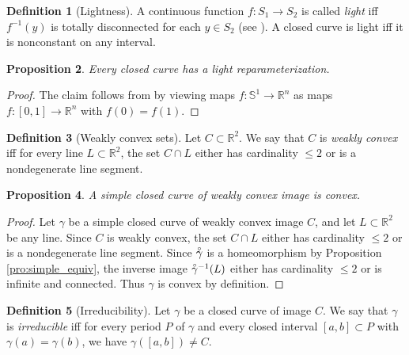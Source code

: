 \documentclass{amsart}
\newtheorem{proposition}{Proposition}[section]
\theoremstyle{definition}
\newtheorem{definition}[proposition]{Definition}
\theoremstyle{remark}
\newcommand{\lring}[1]{\accentset{\circ}{#1}}
\begin{document}
\begin{definition}[Lightness]
    A continuous function $f:S_1\to S_2$ is called \emph{light}
    iff $f^{-1}(y)$ is totally disconnected for each $y\in S_2$
    (see \cite[Definition 13.1]{nadler}). A closed curve
    is light iff it is nonconstant on any interval.
\end{definition}

\begin{proposition}
    \label{pro:light_repar}
    Every closed curve has a light reparameterization.
\end{proposition}

\begin{proof}
    The claim follows from \cite[Corollary 13.4]{nadler}
    by viewing maps $f:\mathbb{S}^1\to\mathbb{R}^n$
    as maps $f:[0,1]\to\mathbb{R}^n$ with $f(0)=f(1)$.
\end{proof}

\begin{definition}[Weakly convex sets]
    Let $C\subset\mathbb{R}^2$. We say that $C$ is \emph{weakly convex}
    iff for every line $L\subset\mathbb{R}^2$, the set $C\cap L$
    either has cardinality $\le2$ or is a nondegenerate line segment.
\end{definition}

\begin{proposition}
    \label{pro:simple_convex}
    A simple closed curve of weakly convex image is convex.
\end{proposition}

\begin{proof}
    Let $\gamma$ be a simple closed curve of weakly convex image $C$,
    and let $L\subset\mathbb{R}^2$ be any line.
    Since $C$ is weakly convex, the set $C\cap L$
    either has cardinality $\le2$ or is a nondegenerate line segment.
    Since $\lring{\gamma}$ is a homeomorphism by Proposition
    \ref{pro:simple_equiv}, the inverse image $\lring{\gamma}^{-1}(L)$
    either has cardinality $\le2$ or is infinite and connected.
    Thus $\gamma$ is convex by definition.
\end{proof}

\begin{definition}[Irreducibility]
    Let $\gamma$ be a closed curve of image $C$.
    We say that $\gamma$ is \emph{irreducible} iff for every period
    $P$ of $\gamma$ and every closed interval $[a,b]\subset P$
    with $\gamma(a)=\gamma(b)$, we have
    $\gamma([a,b])\ne C$.
\end{definition}
\end{document}
